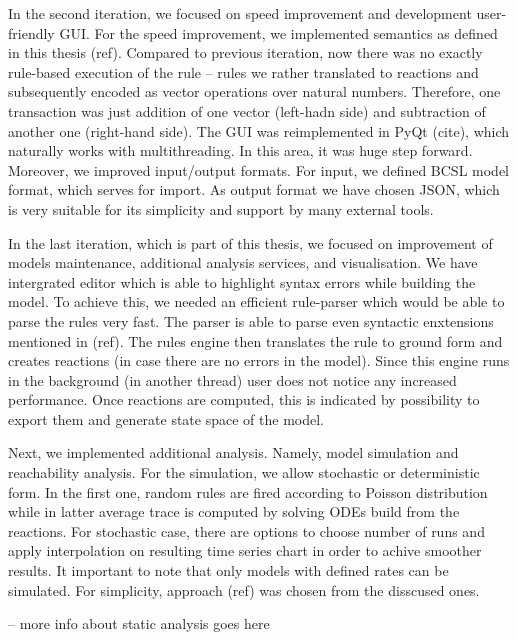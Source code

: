 \documentclass[12pt]{fithesis2}
\begin{document}
In the second iteration, we focused on speed improvement and development user-friendly GUI. For the speed improvement, we implemented semantics as defined in this thesis (ref). Compared to previous iteration, now there was no exactly rule-based execution of the rule -- rules we rather translated to reactions and subsequently encoded as vector operations over natural numbers. Therefore, one transaction was just addition of one vector (left-hadn side) and subtraction of another one (right-hand side). The GUI was reimplemented in PyQt (cite), which naturally works with multithreading. In this area, it was huge step forward. Moreover, we improved input/output formats. For input, we defined BCSL model format, which serves for import. As output format we have chosen JSON, which is very suitable for its simplicity and support by many external tools.

In the last iteration, which is part of this thesis, we focused on improvement of models maintenance, additional analysis services, and visualisation. We have intergrated editor which is able to highlight syntax errors while building the model. To achieve this, we needed an efficient rule-parser which would be able to parse the rules very fast. The parser is able to parse even syntactic enxtensions mentioned in (ref). The rules engine then translates the rule to ground form and creates reactions (in case there are no errors in the model). Since this engine runs in the background (in another thread) user does not notice any increased performance. Once reactions are computed, this is indicated by possibility to export them and generate state space of the model.

Next, we implemented additional analysis. Namely, model simulation and reachability analysis. For the simulation, we allow stochastic or deterministic form. In the first one, random rules are fired according to Poisson distribution while in latter average trace is computed by solving ODEs build from the reactions. For stochastic case, there are options to choose number of runs and apply interpolation on resulting time series chart in order to achive smoother results. It important to note that only models with defined rates can be simulated. For simplicity, approach (ref) was chosen from the disscused ones.

 -- more info about static analysis goes here
\end{document}
